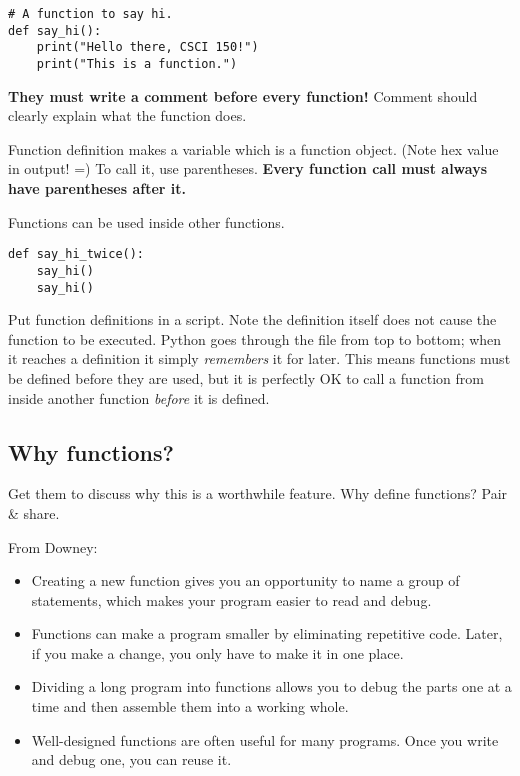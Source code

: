 \documentclass{article}
\begin{document}
\begin{verbatim}
# A function to say hi.
def say_hi():
    print("Hello there, CSCI 150!")
    print("This is a function.")
\end{verbatim}

\textbf{They must write a comment before every function!}  Comment
should clearly explain what the function does.

Function definition makes a variable which is a function object. (Note
hex value in output! =) To call it, use parentheses.  \textbf{Every
  function call must always have parentheses after it.}

Functions can be used inside other functions.

\begin{verbatim}
def say_hi_twice():
    say_hi()
    say_hi()
\end{verbatim}

Put function definitions in a script.  Note the definition itself does
not cause the function to be executed.  Python goes through the file
from top to bottom; when it reaches a definition it simply
\emph{remembers} it for later.  This means functions must be defined
before they are used, but it is perfectly OK to call a function from
inside another function \emph{before} it is defined.

\subsection*{Why functions?}

Get them to discuss why this is a worthwhile feature.  Why define
functions?  Pair \& share.

From Downey:

\begin{itemize}
\item Creating a new function gives you an opportunity to name a group
  of statements, which makes your program easier to read and debug.
\item  Functions can make a program smaller by eliminating repetitive code.
  Later, if you make a change, you only have to make it in one place.
\item Dividing a long program into
  functions allows you to debug the parts one at a time and then
  assemble them into a working whole.
\item Well-designed functions are often useful for many programs.
  Once you write and debug one, you can reuse it.
\end{itemize}
\end{document}
